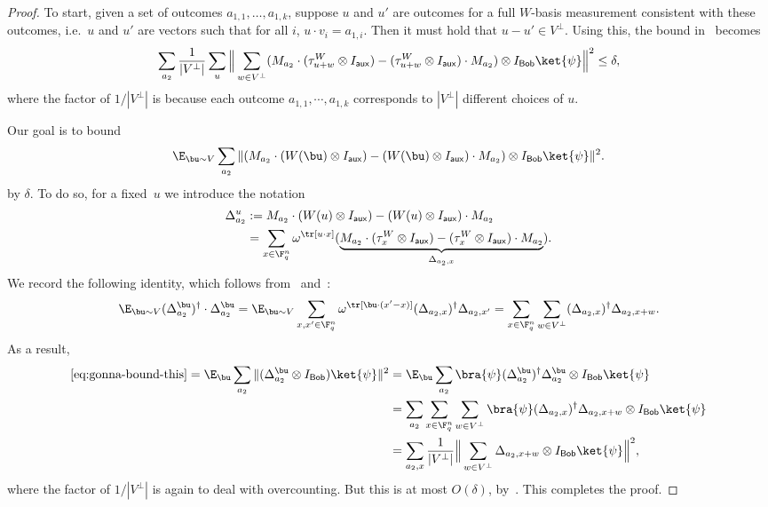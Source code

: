 \documentclass[11pt]{article}
\newcommand{\reg}[1]{{\mathsf{#1}}}
\begin{document}
\begin{proof}
To start, given a set of outcomes $a_{1,1}, \dots, a_{1,k}$, suppose
$u$ and $u'$ are outcomes for a full $W$-basis measurement consistent with
these outcomes, i.e.\ $u$ and $u'$ are vectors such that for all $i$, $u \cdot
v_i = a_{1,i}$. Then it must hold that $u - u' \in V^\perp$. Using
this, the bound in~ becomes
\begin{equation}\label{eq:m-commutes-subspace-proj2}
  \sum_{a_2} \frac{1}{|V^\perp|} \sum_{u} \Big\| \sum_{w \in V^\perp} (M_{a_2} \cdot
  (\tau^W_{u+w} \otimes I_{\reg{aux}}) - (\tau^{W}_{u+w} \otimes I_{\reg{aux}}) \cdot M_{a_2}) \otimes I_{\reg{Bob}} \ket{\psi}\Big\|^2 \leq \delta,
\end{equation}
where the factor of $1/|V^\perp|$ is because each outcome $a_{1,1},
\cdots, a_{1,k}$ corresponds to $|V^\perp|$ different choices of $u$.
  
Our goal is to bound
\begin{equation}\label{eq:gonna-bound-this}
\E_{\bu\sim V} \sum_{a_2} \Vert (M_{a_2} \cdot (W(\bu)\otimes I_{\reg{aux}}) - (W(\bu)\otimes I_{\reg{aux}}) \cdot M_{a_2}) \otimes I_{\reg{Bob}} \ket{\psi} \Vert^2.
\end{equation}
by $\delta$.
To do so, for a fixed~$u$ we introduce the notation
\begin{align}
\Delta_{a_2}^{u}
&:= M_{a_2} \cdot (W(u) \otimes I_{\reg{aux}})- (W(u)\otimes I_{\reg{aux}}) \cdot M_{a_2}\\
&= \sum_{x \in \F_q^n} \omega^{\tr[u \cdot x]} (\underbrace{M_{a_2} \cdot (\tau^{W}_{x} \otimes I_{\reg{aux}})
	- (\tau^{W}_{x} \otimes I_{\reg{aux}}) \cdot M_{a_2}}_{\Delta_{a_2,x}}).\label{eq:pauli-obs-commutator}
\end{align}
We record the following identity, which follows
from~ and~:
\begin{equation*}
\E_{\bu \sim V } (\Delta_{a_2}^{\bu})^\dagger\cdot \Delta_{a_2}^{\bu}
= \E_{\bu \sim V} \sum_{x, x' \in \F_q^n} \omega^{\tr[\bu \cdot (x' - x)]} (\Delta_{a_2,x})^\dagger \Delta_{a_2,x'}
= \sum_{x \in \F_q^n} \sum_{w \in V^\perp} (\Delta_{a_2,x})^\dagger \Delta_{a_2,x+w}.
\end{equation*}
As a result,
\begin{align*}
\eqref{eq:gonna-bound-this}=
\E_{\bu} \sum_{a_2}\Vert (\Delta_{a_2}^{\bu} \otimes I_{\reg{Bob}}) \ket{\psi}\Vert^2
&= \E_{\bu} \sum_{a_2} \bra{\psi} (\Delta_{a_2}^{\bu})^\dagger \Delta_{a_2}^{\bu} \otimes I_{\reg{Bob}} \ket{\psi}\\
&=  \sum_{a_2} \sum_{x \in \F_q^n} \sum_{ w\in V^\perp} \bra{\psi}(\Delta_{a_2,x})^\dagger \Delta_{a_2,x+w} \otimes I_{\reg{Bob}} \ket{\psi}\\
&= \sum_{a_2, x} \frac{1}{|V^\perp|} \Big\| \sum_{w \in V^\perp} \Delta_{a_2,x+w} \otimes I_{\reg{Bob}} \ket{\psi} \Big\|^2,
\end{align*}
where the factor of $1/|V^\perp|$ is again to deal with overcounting. But this is at most $O(\delta)$, by~. This completes the proof.
\end{proof}
\end{document}
